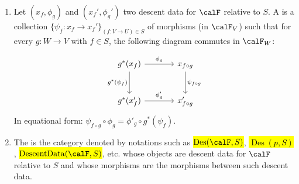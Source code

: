 \begin{definition}
\begin{enumerate}
    \item Let $(x_f, \phi_g)$ and $(x_f', \phi_g')$ two descent data for $\calF$ relative to $S$. A  is a collection $\{\psi_f: x_f \to x_f' \}_{(f: V \to U) \in S}$ of morphisms (in $\calF_V$) such that for every $g: W \to V$ with $f \in S$, the following diagram commutes in $\calF_W$:

    $$\begin{tikzcd}[row sep=large, column sep=large]
    g^*(x_f) \arrow[r, "\phi_g"] \arrow[d, "g^*(\psi_f)"'] & x_{f \circ g} \arrow[d, "\psi_{f \circ g}"] \\
    g^*(x'_f) \arrow[r, "\phi'_g"] & x'_{f \circ g}
    \end{tikzcd}$$
    In equational form: $\psi_{f \circ g} \circ \phi_g = \phi'_g \circ g^*(\psi_f)$.

    \item The  is the category denoted by notations such as \hl{$\operatorname{Des}(\calF, S)$}, \hl{$\operatorname{Des}(p, S)$}, \hl{$\operatorname{DescentData}(\calF, S)$}, etc. whose objects are descent data for $\calF$ relative to $S$ and whose morphisms are the morphisms between such descent data. 
\end{enumerate}
\end{definition}